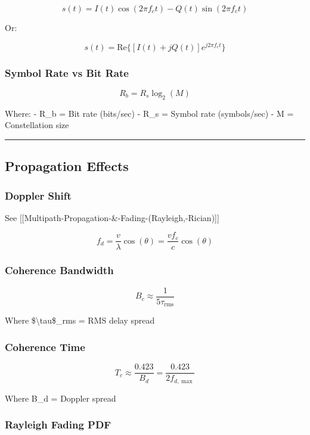 \[
s(t) = I(t)\cos(2\pi f_c t) - Q(t)\sin(2\pi f_c t)
\]

Or:

\[
s(t) = \text{Re}\{[I(t) + jQ(t)]e^{j2\pi f_c t}\}
\]

\subsubsection{Symbol Rate vs Bit Rate}\label{symbol-rate-vs-bit-rate}

\[
R_b = R_s \log_2(M)
\]

Where: - R\_b = Bit rate (bits/sec) - R\_s = Symbol rate (symbols/sec) -
M = Constellation size

\begin{center}\rule{0.5\linewidth}{0.5pt}\end{center}

\subsection{\texorpdfstring{ Propagation
Effects}{ Propagation Effects}}\label{propagation-effects}

\subsubsection{Doppler Shift}\label{doppler-shift}

See {[}{[}Multipath-Propagation-\&-Fading-(Rayleigh,-Rician){]}{]}

\[
f_d = \frac{v}{\lambda} \cos(\theta) = \frac{vf_c}{c} \cos(\theta)
\]

\subsubsection{Coherence Bandwidth}\label{coherence-bandwidth}

\[
B_c \approx \frac{1}{5\tau_{\text{rms}}}
\]

Where \$\textbackslash tau\$\_rms = RMS delay spread

\subsubsection{Coherence Time}\label{coherence-time}

\[
T_c \approx \frac{0.423}{B_d} = \frac{0.423}{2f_{d,\max}}
\]

Where B\_d = Doppler spread

\subsubsection{Rayleigh Fading PDF}\label{rayleigh-fading-pdf}

